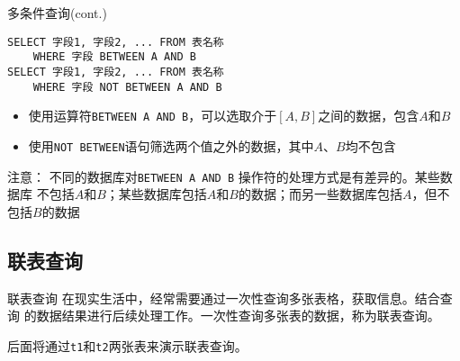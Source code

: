 \documentclass[t]{beamer}
\begin{document}
\begin{frame}[fragile]{多条件查询(cont.)}
\begin{lstlisting}
SELECT 字段1, 字段2, ... FROM 表名称
    WHERE 字段 BETWEEN A AND B
SELECT 字段1, 字段2, ... FROM 表名称
    WHERE 字段 NOT BETWEEN A AND B
\end{lstlisting}
\begin{itemize}
  \item 使用运算符\verb|BETWEEN A AND B|，可以选取介于$[A,B]$之间的数据，包含$A$和$B$
  \item 使用\verb|NOT BETWEEN|语句筛选两个值之外的数据，其中$A$、$B$均不包含
\end{itemize}
\begin{block}{注意：}
  不同的数据库对\texttt{BETWEEN A AND B} 操作符的处理方式是有差异的。某些数据库
  不包括$A$和$B$；某些数据库包括$A$和$B$的数据；而另一些数据库包括$A$，但不包括$B$的数据
\end{block}
\end{frame}

\subsection{联表查询}
\begin{frame}[fragile]{联表查询}
  在现实生活中，经常需要通过一次性查询多张表格，获取信息。结合查询
  的数据结果进行后续处理工作。一次性查询多张表的数据，称为联表查询。

  后面将通过\verb|t1|和\verb|t2|两张表来演示联表查询。
\end{frame}

\end{document}
